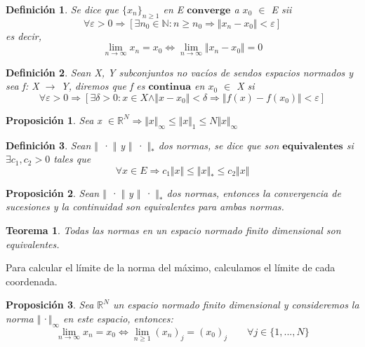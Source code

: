 \documentclass[10pt, a4paper]{article}
\theoremstyle{theorem-style}
\newtheorem{nth}{Teorema}[section]
\newtheorem{nprop}{Proposición}[section]
\theoremstyle{definition-style}
\newtheorem{ndef}{Definición}[section]
\theoremstyle{remark-style}
\theoremstyle{example-style}
\theoremstyle{definition-style}
\theoremstyle{remark-style}
\begin{document}
\begin{ndef}
Se dice que $\lbrace x_n \rbrace _{n \geq 1}$ en E $\textbf{converge}$ a $x_0$ $\in$ E sii
\[ \forall \varepsilon > 0 \Rightarrow \left[ \exists n_0 \in \mathbb{N} : n \geq n_0 \Rightarrow \Vert x_n - x_0 \Vert < \varepsilon \right] \]
es decir,
\[ \lim_{n \rightarrow \infty} x_n = x_0  \Leftrightarrow \lim_{n \rightarrow \infty} \Vert x_n - x_0 \Vert = 0 \]
\end{ndef}

\begin{ndef}
Sean X, Y subconjuntos no vacíos de sendos espacios normados y sea f: X $\rightarrow$ Y, diremos que f es $\textbf{continua}$ en $x_{0}$ $\in$ X si
\[ \forall \varepsilon > 0 \Rightarrow \left[ \exists \delta > 0 : x \in X \wedge \Vert x - x_0 \Vert < \delta \Rightarrow \Vert f(x) - f(x_0) \Vert < \varepsilon \right] \]
\end{ndef}

\begin{nprop}
Sea x $\in \mathbb{R}^N \Rightarrow \Vert x \Vert _\infty \leq \Vert x \Vert _1 \leq N\Vert x \Vert _\infty $ 
\end{nprop}

\begin{ndef}
Sean $\Vert$ · $\Vert$ y $\Vert$ · $\Vert _*$ dos normas, se dice que son $\textbf{equivalentes}$ si $\exists c_1, c_2 > 0$ tales que
\[ \forall x \in E \Rightarrow c_1\Vert x \Vert \leq \Vert x \Vert _* \leq c_2\Vert x \Vert \] 
\end{ndef}

\begin{nprop}
Sean $\Vert$ · $\Vert$ y $\Vert$ · $\Vert _*$ dos normas, entonces la convergencia de sucesiones y la continuidad son equivalentes para ambas normas. 
\end{nprop}

\begin{nth}
Todas las normas en un espacio normado finito dimensional son equivalentes.
\end{nth}

Para calcular el límite de la norma del máximo, calculamos el límite de cada coordenada.

\begin{nprop}
Sea $\mathbb{R}^N$ un espacio normado finito dimensional y consideremos la norma $\Vert$·$\Vert _\infty$ en este espacio, entonces:
\[ \lim_{n \rightarrow \infty}x_n = x_0 \Leftrightarrow \lim_{n \geq 1}(x_n)_j = (x_0)_j \qquad \forall j\in \lbrace 1,...,N \rbrace \]
\end{nprop}
\end{document}
